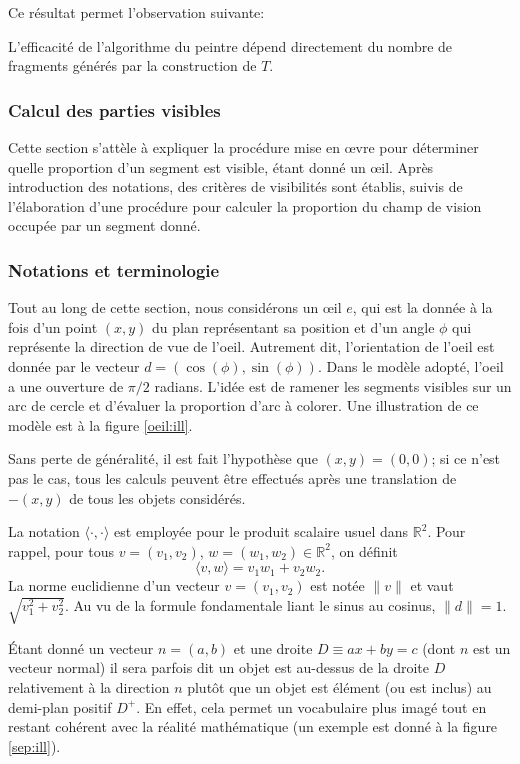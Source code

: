 Ce résultat permet l'observation suivante:
\begin{cor}
  L'efficacité de l'algorithme du peintre dépend directement
  du nombre de fragments générés par la construction de $T$.
\end{cor}
\subsubsection{Calcul des parties visibles}
Cette section s'attèle à expliquer la procédure mise en \oe{}vre pour déterminer
quelle proportion d'un segment est visible, étant donné un \oe{}il.
Après introduction des notations, des critères de visibilités sont
établis, suivis de l'élaboration d'une procédure pour calculer la
proportion du champ de vision occupée par un segment donné.

\subsubsection{Notations et terminologie}
Tout au long de cette section, nous considérons un \oe{}il $e$, qui est la donnée à
la fois d'un point $(x, y)$ du plan représentant sa position et d'un angle $\phi$
qui représente la direction de vue de l'oeil. Autrement dit, l'orientation de
l'oeil est donnée par le vecteur $d=(\cos(\phi), \sin(\phi))$. Dans le modèle
adopté, l'oeil a une ouverture de $\pi/2$ radians. L'idée est de ramener
les segments visibles sur un arc de cercle et d'évaluer la proportion d'arc
à colorer. Une illustration de ce modèle est à la figure \ref{oeil:ill}.



Sans perte de généralité, il est fait l'hypothèse que $(x, y) = (0, 0)$;
si ce n'est pas le cas, tous les
calculs peuvent être effectués après une translation de $-(x, y)$ de tous
les objets considérés.

La notation $\langle \cdot,\cdot\rangle$ est employée pour le produit scalaire usuel
dans $\mathbb R^2$. Pour rappel, pour tous $v=(v_1, v_2)$,
$w=(w_1, w_2)\in\mathbb R^2$, on définit
$$\langle v, w\rangle = v_1 w_1 + v_2 w_2.$$
La norme euclidienne d'un vecteur $v = (v_1, v_2)$ est notée
$\|v\|$ et vaut $\sqrt{v_1^2 + v_2^2}$. Au vu de la formule fondamentale liant le
sinus au cosinus, $\|d\| = 1$.

\'Etant  donné un vecteur $n = (a, b)$ et une droite $D\equiv ax+by=c$
(dont $n$ est un vecteur normal) il sera parfois dit
\og un objet est au-dessus de la droite $D$ relativement à la direction $n$\fg{}
plutôt que \og{}un objet est élément (ou est inclus) au demi-plan positif $D^+$\fg{}.
En effet, cela permet un vocabulaire plus imagé tout en restant cohérent
avec la réalité mathématique (un exemple est donné à la figure \ref{sep:ill}).

